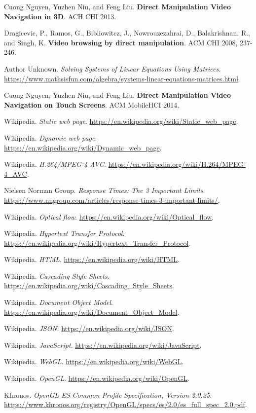 \begin{thebibliography}{9}

Cuong Nguyen, Yuzhen Niu, and Feng Liu. \textbf{Direct Manipulation Video Navigation in 3D}. ACH CHI 2013.

Dragicevic, P., Ramos, G., Bibliowitcz, J., Nowrouzezahrai, D., Balakrishnan, R., and Singh, K. \textbf{Video browsing by direct manipulation}. ACM CHI 2008, 237-246.

Author Unknown. \textit{Solving Systems of Linear Equations Using Matrices}. \url{https://www.mathsisfun.com/algebra/systems-linear-equations-matrices.html}.

Cuong Nguyen, Yuzhen Niu, and Feng Liu. \textbf{Direct Manipulation Video Navigation on Touch Screens}. ACM MobileHCI 2014.

Wikipedia. \textit{Static web page}. \url{https://en.wikipedia.org/wiki/Static_web_page}.

Wikipedia. \textit{Dynamic web page}. \url{https://en.wikipedia.org/wiki/Dynamic_web_page}.

Wikipedia. \textit{H.264/MPEG-4 AVC}. \url{https://en.wikipedia.org/wiki/H.264/MPEG-4_AVC}.

Nielsen Norman Group. \textit{Response Times: The 3 Important Limits}. \url{https://www.nngroup.com/articles/response-times-3-important-limits/}.

Wikipedia. \textit{Optical flow}. \url{https://en.wikipedia.org/wiki/Optical_flow}.

Wikipedia. \textit{Hypertext Transfer Protocol}. \url{https://en.wikipedia.org/wiki/Hypertext_Transfer_Protocol}.

Wikipedia. \textit{HTML}. \url{https://en.wikipedia.org/wiki/HTML}.

Wikipedia. \textit{Cascading Style Sheets}. \url{https://en.wikipedia.org/wiki/Cascading_Style_Sheets}.

Wikipedia. \textit{Document Object Model}. \url{https://en.wikipedia.org/wiki/Document_Object_Model}.

Wikipedia. \textit{JSON}. \url{https://en.wikipedia.org/wiki/JSON}.

Wikipedia. \textit{JavaScript}. \url{https://en.wikipedia.org/wiki/JavaScript}.

Wikipedia. \textit{WebGL}. \url{https://en.wikipedia.org/wiki/WebGL}.

Wikipedia. \textit{OpenGL}. \url{https://en.wikipedia.org/wiki/OpenGL}.

Khronos. \textit{OpenGL ES Common Profile Specification, Version 2.0.25}. \url{https://www.khronos.org/registry/OpenGL/specs/es/2.0/es_full_spec_2.0.pdf}.

\end{thebibliography}

